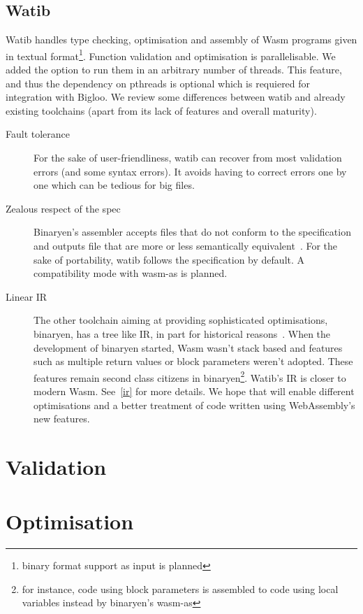 \documentclass[10pt]{article}
\begin{document}
\subsection{Watib}
Watib handles type checking, optimisation and assembly of Wasm programs given in
textual format\footnote{binary format support as input is planned}. Function
validation and optimisation is parallelisable. We added the option to run them
in an arbitrary number of threads. This feature, and thus the dependency on
pthreads is optional which is requiered for integration with Bigloo. We review
some differences between watib and already existing toolchains (apart from its
lack of features and overall maturity).
\begin{description}
\item[Fault tolerance] For the sake of user-friendliness, watib can recover from
  most validation errors (and some syntax errors). It avoids having to correct
  errors one by one which can be tedious for big files.
\item[{Zealous\protect\footnotemark} respect of the spec] Binaryen's assembler accepts files
  that do not conform to the specification and outputs file that are more or
  less semantically equivalent~\cite{WasmAsExtension}. For the sake of
  portability, watib follows the specification by default. A compatibility mode
  with \textsf{wasm-as} is planned.
\item[Linear IR] The other toolchain aiming at providing sophisticated
  optimisations, binaryen, has a tree like IR, in part for historical
  reasons~\cite{BinaryenIR}. When the development of binaryen started, Wasm
  wasn't stack based and features such as multiple return values or block
  parameters weren't adopted. These features remain second class citizens in
  binaryen\footnote{for instance, code using block parameters is assembled to
  code using local variables instead by binaryen's \textsf{wasm-as}}. Watib's IR
  is closer to modern Wasm. See~\ref{ir} for more details. We hope that will
  enable different optimisations and a better treatment of code written using
  WebAssembly's new features.
\end{description}
\section{Validation}
\section{Optimisation}
\end{document}
